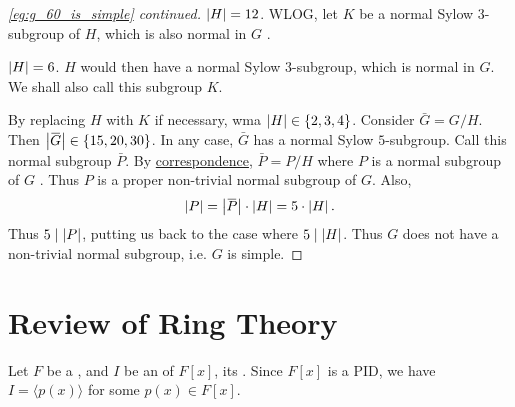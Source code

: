 \documentclass[notoc,notitlepage,nobib]{tufte-book}
\begin{document}
\begin{proof}[\cref{eg:g_60_is_simple} continued]
   $\left|H\right| = 12$. WLOG, let $K$ be a normal Sylow $3$-subgroup
  of $H$, which is also normal in $G$ .

  \noindent
   $\left|H\right| = 6$. $H$ would then have a normal Sylow $3$-subgroup,
  which is normal in $G$. We shall also call this subgroup $K$.

  \noindent
  By replacing $H$ with $K$ if necessary, wma $\left| H \right| \in \left\{ 2, 3, 4 \right\}$.
  Consider $\bar{G} = G / H$. Then $\abs{ \bar{G} } \in \left\{ 15, 20, 30 \right\}$.
  In any case, $\bar{G}$ has a normal Sylow $5$-subgroup. Call this normal subgroup 
  $\bar{P}$. By \hyperref[thm:correspondence_theorem]{correspondence}, $\bar{P} = P / H$
  where $P$ is a normal subgroup of $G$ . Thus $P$ is a proper non-trivial normal subgroup of $G$.
  Also,
  \begin{equation*}
    \abs{ P } = \abs{ \bar{P} } \cdot \abs{ H } = 5 \cdot \abs{ H }.
  \end{equation*}
  Thus $5 \mid \left| P \right|$, putting us back to the case where $5 \mid \left| H \right|$.
  Thus $G$ does not have a non-trivial normal subgroup, i.e. $G$ is simple.
\end{proof}


\section{Review of Ring Theory}%
\label{sec:review_of_ring_theory}

Let $F$ be a , and $I$ be an  of $F[x]$, its
. Since $F[x]$ is a PID, we have $I = \langle p(x) \rangle$
for some $p(x) \in F[x]$.
\end{document}
